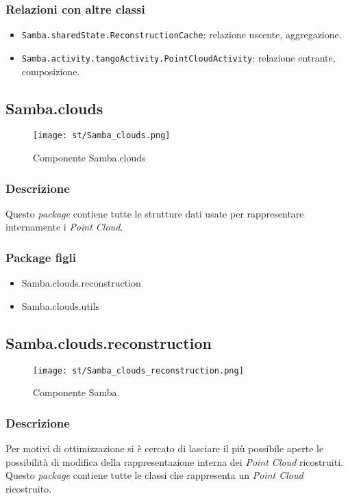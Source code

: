 \subsubsection{Relazioni con altre classi}
\begin{itemize}
	\item \texttt{Samba.sharedState.ReconstructionCache}: relazione uscente, aggregazione.
	\item \texttt{Samba.activity.tangoActivity.PointCloudActivity}: relazione entrante, composizione.	
\end{itemize}


\subsection{Samba.clouds}
\begin{figure}[!h] 
    \centering 
    \texttt{[image: st/Samba\_clouds.png]} 
    \caption{Componente Samba.clouds}
\end{figure}
\subsubsection{Descrizione}
Questo \emph{package} contiene tutte le strutture dati usate per rappresentare internamente i \emph{Point Cloud}.
\subsubsection{Package figli}
\begin{itemize}
	\item Samba.clouds.reconstruction
	\item Samba.clouds.utils
\end{itemize}


\subsection{Samba.clouds.reconstruction}
\begin{figure}[!h] 
    \centering 
    \texttt{[image: st/Samba\_clouds\_reconstruction.png]} 
    \caption{Componente Samba.}
\end{figure}
\subsubsection{Descrizione}
Per motivi di ottimizzazione si è cercato di lasciare il più possibile aperte le possibilità di modifica della rappresentazione interna dei \emph{Point Cloud} ricostruiti. Questo \emph{package} contiene tutte le classi che rappresenta un \emph{Point Cloud} ricostruito.
